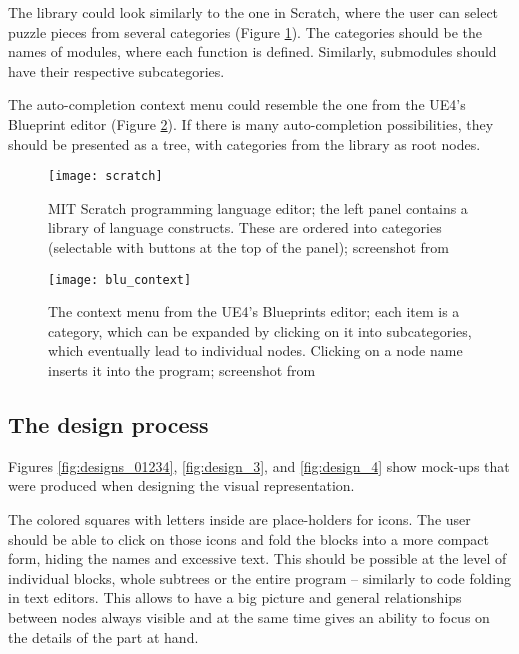 The library could look similarly to the one in Scratch, where the user can select puzzle pieces from several categories (Figure \ref{fig:scratch2}). The categories should be the names of modules, where each function is defined. Similarly, submodules should have their respective subcategories.

The auto-completion context menu could resemble the one from the UE4's Blueprint editor (Figure \ref{fig:blu_context}). If there is many auto-completion possibilities, they should be presented as a tree, with categories from the library as root nodes.

\begin{figure}[h!]
\centering \texttt{[image: scratch]}
\caption{
    MIT Scratch programming language editor;
    the left panel contains a library of language constructs. These are ordered into categories (selectable with buttons at the top of the panel);
    screenshot from\protect\cite{fig_scratch}
}
\label{fig:scratch2}
\end{figure}

\begin{figure}[h!]
\centering \texttt{[image: blu\_context]}
\caption{
    The context menu from the UE4's Blueprints editor;
    each item is a category, which can be expanded by clicking on it into subcategories, which eventually lead to individual nodes. Clicking on a node name inserts it into the program;
    screenshot from\protect\cite{fig_blu_context}
}
\label{fig:blu_context}
\end{figure}

\subsection{The design process}
Figures \ref{fig:designs_01234}, \ref{fig:design_3}, and \ref{fig:design_4} show mock-ups that were produced when designing the visual representation.

The colored squares with letters inside are place-holders for icons. The user should be able to click on those icons and fold the blocks into a more compact form, hiding the names and excessive text. This should be possible at the level of individual blocks, whole subtrees or the entire program -- similarly to code folding in text editors. This allows to have a big picture and general relationships between nodes always visible and at the same time gives an ability to focus on the details of the part at hand.

